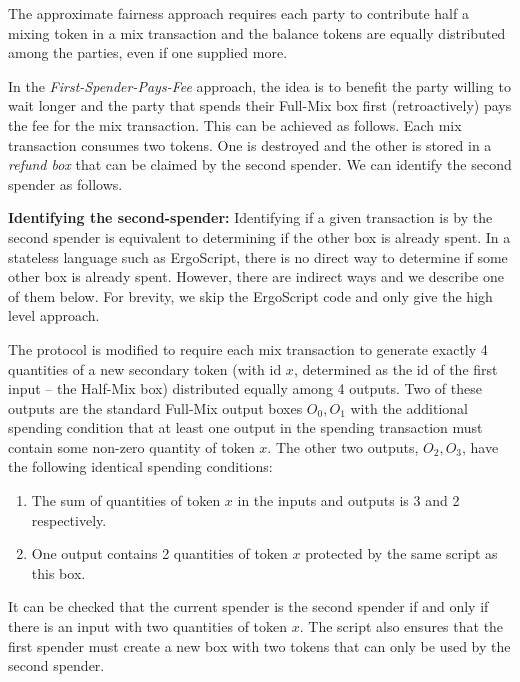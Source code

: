 \documentclass[11pt]{article}
\newcommand{\langname}{ErgoScript\xspace}
\begin{document}
The approximate fairness approach requires each party to contribute half a mixing token in a mix transaction and the balance tokens are equally distributed among the parties, even if one supplied more. 


In the {\em First-Spender-Pays-Fee} approach, the idea is to benefit the party willing to wait longer and the party that spends their Full-Mix box first (retroactively) pays the fee for the mix transaction. This can be achieved as follows. Each mix transaction consumes two tokens. One is destroyed and the other is stored in a {\em refund box} that can be claimed by the second spender. We can identify the second spender as follows. 

\textbf{Identifying the second-spender:} Identifying if a given transaction is by the second spender is equivalent to determining if the other box is already spent. In a stateless language such as \langname, there is no direct way to determine if some other box is already spent. However, there are indirect ways and we describe one of them below. For brevity, we skip the \langname code and only give the high level approach. 

The protocol is modified to require each mix transaction to generate exactly 4 quantities of a new secondary token (with id $x$, determined as the id of the first input -- the Half-Mix box) distributed equally among 4 outputs. Two of these outputs are the standard Full-Mix output boxes $O_0, O_1$ with the additional spending condition that at least one output in the spending transaction must contain some non-zero quantity of token $x$. The other two outputs, $O_2, O_3$, have the following identical spending conditions:
\begin{enumerate}
	\item The sum of quantities of token $x$ in the inputs and outputs is 3 and 2 respectively.
	\item One output contains 2 quantities of token $x$ protected by the same script as this box. 
\end{enumerate}

It can be checked that the current spender is the second spender if and only if there is an input with two quantities of token $x$. The script also ensures that the first spender must create a new box with two tokens that can only be used by the second spender.
\end{document}
